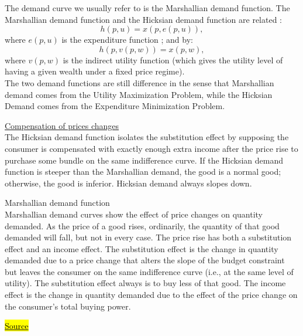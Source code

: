 \documentclass[a4paper, 12pt, reqno]{article}
\begin{document}
The demand curve we usually refer to is the Marshallian demand function. The Marshallian demand function and the Hicksian demand function are related :
$$h(p,u) = x(p,e(p,u)),$$
where $e(p,u)$ is the expenditure function ; and by:
$$h(p, v(p,w)) = x(p,w),$$
where $v(p,w)$ is the indirect utility function (which gives the utility level of having a given wealth under a fixed price regime). \\
The two demand functions are still difference in the sense that Marshallian demand comes from the Utility Maximization Problem, while the Hicksian Demand comes from the Expenditure Minimization Problem.

\underline{Compensation of prices changes} \\
The Hicksian demand function isolates the substitution effect by supposing the consumer is compensated with exactly enough extra income after the price rise to purchase some bundle on the same indifference curve. If the Hicksian demand function is steeper than the Marshallian demand, the good is a normal good; otherwise, the good is inferior. 
Hicksian demand always slopes down.
\begin{tcolorbox}
    Marshallian demand function\\
    Marshallian demand curves show the effect of price changes on quantity demanded. As the price of a good rises, ordinarily, the quantity of that good demanded will fall, but not in every case. 
    The price rise has both a substitution effect and an income effect. The substitution effect is the change in quantity demanded due to a price change that alters the slope of the budget constraint but leaves the consumer on the same indifference curve 
    (i.e., at the same level of utility). The substitution effect always is to buy less of that good. The income effect is the change in quantity demanded due to the effect of the price change on the consumer's total buying power. 
\end{tcolorbox}
\href{https://en.wikipedia.org/wiki/Hicksian_demand_function}{\hl{Source}}
\end{document}
